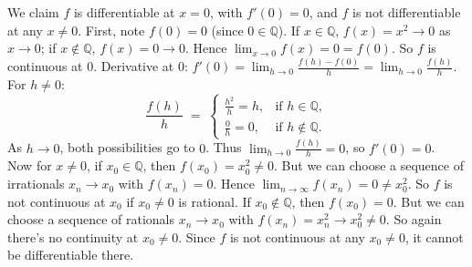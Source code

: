 \documentclass[11pt]{article}
\begin{document}
\begin{exercise}{2}
    We claim $f$ is differentiable at $x=0$, with $f'(0)=0$, and $f$ is not differentiable at any $x \neq 0$. First, note $f(0)=0$ (since $0\in\mathbb{Q}$). If $x\in\mathbb{Q}$, $f(x)=x^2\to 0$ as $x\to 0$; if $x\notin\mathbb{Q}$, $f(x)=0\to 0$. Hence $\lim_{x\to 0} f(x)=0=f(0)$. So $f$ is continuous at $0$. Derivative at $0$: 
  \(
    f'(0)
    = \lim_{h\to 0}\frac{f(h)-f(0)}{h}
    = \lim_{h\to 0}\frac{f(h)}{h}.
  \)
  For $h\neq 0$:
  \[
    \frac{f(h)}{h} \;=\;
    \begin{cases}
       \frac{h^2}{h} = h, & \text{if }h\in\mathbb{Q},\\[4pt]
       \frac{0}{h} = 0,   & \text{if }h\notin\mathbb{Q}.
    \end{cases}
  \]
  As $h\to 0$, both possibilities go to $0$. Thus $\lim_{h\to 0} \tfrac{f(h)}{h}=0$, so $f'(0)=0$. \\
    
  Now for $x \neq 0$, if $x_0\in\mathbb{Q}$, then $f(x_0)=x_0^2 \neq 0$. 
  But we can choose a sequence of irrationals $x_n\to x_0$ with $f(x_n)=0$. Hence $\lim_{n\to\infty}f(x_n)=0\neq x_0^2$. 
  So $f$ is not continuous at $x_0$ if $x_0\neq 0$ is rational. If $x_0\notin\mathbb{Q}$, then $f(x_0)=0$. 
  But we can choose a sequence of rationals $x_n\to x_0$ with $f(x_n)=x_n^2\to x_0^2\neq 0$. 
  So again there's no continuity at $x_0\neq 0$. Since $f$ is not continuous at any $x_0\neq 0$, it cannot be differentiable there.
\end{exercise}
\end{document}
